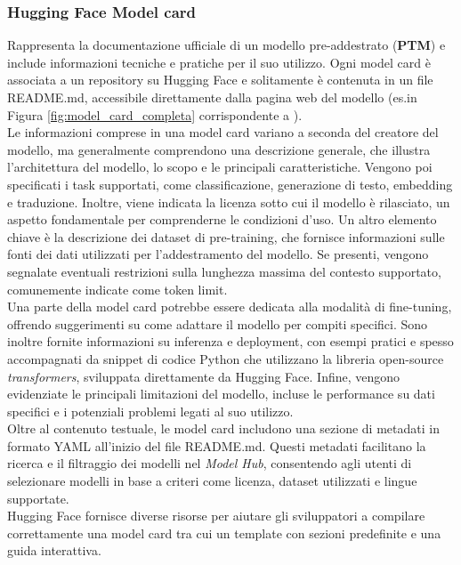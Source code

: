 \documentclass{article}
\begin{document}
\subsubsection{Hugging Face Model card} 
Rappresenta la documentazione ufficiale di un modello pre-addestrato (\textbf{PTM})  e include informazioni tecniche e pratiche per il suo utilizzo\cite{huggingface_model_cards}. Ogni model card è associata a un repository su Hugging Face e solitamente è contenuta in un file README.md, accessibile direttamente dalla pagina web del modello (es.in Figura \ref{fig:model_card_completa} corrispondente a \cite{all-MiniLM-L6-v2}).\\
Le informazioni comprese in una model card variano a seconda del creatore del modello, ma generalmente comprendono una descrizione generale, che illustra l'architettura del modello, lo scopo e le principali caratteristiche. Vengono poi specificati i task supportati, come classificazione, generazione di testo, embedding e traduzione. Inoltre, viene indicata la licenza sotto cui il modello è rilasciato, un aspetto fondamentale per comprenderne le condizioni d'uso. Un altro elemento chiave è la descrizione dei dataset di pre-training, che fornisce informazioni sulle fonti dei dati utilizzati per l'addestramento del modello. Se presenti, vengono segnalate eventuali restrizioni sulla lunghezza massima del contesto supportato, comunemente indicate come token limit.\\
Una parte della model card potrebbe essere dedicata alla modalità di fine-tuning, offrendo suggerimenti su come adattare il modello per compiti specifici. Sono inoltre fornite informazioni su inferenza e deployment, con esempi pratici e spesso accompagnati da snippet di codice Python che utilizzano la libreria open-source \textit{transformers}\cite{wolf-etal-2020-transformers}, sviluppata direttamente da Hugging Face. Infine, vengono evidenziate le principali limitazioni del modello, incluse le performance su dati specifici e i potenziali problemi legati al suo utilizzo.\\
Oltre al contenuto testuale, le model card includono una sezione di metadati in formato YAML all'inizio del file README.md. Questi metadati facilitano la ricerca e il filtraggio dei modelli nel \textit{Model Hub}, consentendo agli utenti di selezionare modelli in base a criteri come licenza, dataset utilizzati e lingue supportate.\\
Hugging Face fornisce diverse risorse per aiutare gli sviluppatori a compilare correttamente una model card tra cui un template con sezioni predefinite e una guida interattiva.\\
\end{document}
